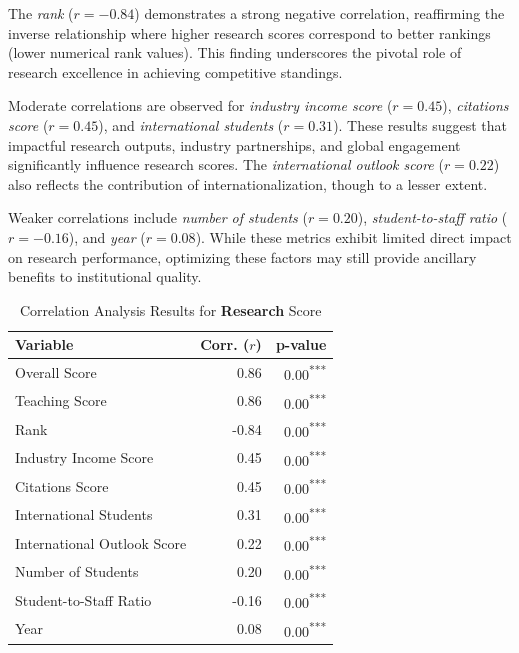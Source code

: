 \documentclass[sigconf]{acmart}
\begin{document}
The \textit{rank} ($r = -0.84$) demonstrates a strong negative correlation, reaffirming the inverse relationship where higher research scores correspond to better rankings (lower numerical rank values). This finding underscores the pivotal role of research excellence in achieving competitive standings.

Moderate correlations are observed for \textit{industry income score} ($r = 0.45$), \textit{citations score} ($r = 0.45$), and \textit{international students} ($r = 0.31$). These results suggest that impactful research outputs, industry partnerships, and global engagement significantly influence research scores. The \textit{international outlook score} ($r = 0.22$) also reflects the contribution of internationalization, though to a lesser extent.

Weaker correlations include \textit{number of students} ($r = 0.20$), \textit{student-to-staff ratio} ($r = -0.16$), and \textit{year} ($r = 0.08$). While these metrics exhibit limited direct impact on research performance, optimizing these factors may still provide ancillary benefits to institutional quality.

\begin{table}[h!]
	\centering
	\caption{Correlation Analysis Results for \textbf{Research} Score}
	\label{tab:correlation_research}
	\begin{tabular}{|l|r|r|}
		\hline
		\textbf{Variable} & \textbf{Corr. ($r$)} & \textbf{p-value} \\
		\hline
		Overall Score & 0.86 & 0.00\textsuperscript{***} \\
		Teaching Score & 0.86 & 0.00\textsuperscript{***} \\
		Rank & -0.84 & 0.00\textsuperscript{***} \\
		Industry Income Score & 0.45 & 0.00\textsuperscript{***} \\
		Citations Score & 0.45 & 0.00\textsuperscript{***} \\
		International Students & 0.31 & 0.00\textsuperscript{***} \\
		International Outlook Score & 0.22 & 0.00\textsuperscript{***} \\
		Number of Students & 0.20 & 0.00\textsuperscript{***} \\
		Student-to-Staff Ratio & -0.16 & 0.00\textsuperscript{***} \\
		Year & 0.08 & 0.00\textsuperscript{***} \\
		\hline
	\end{tabular}
\end{table}
\end{document}
